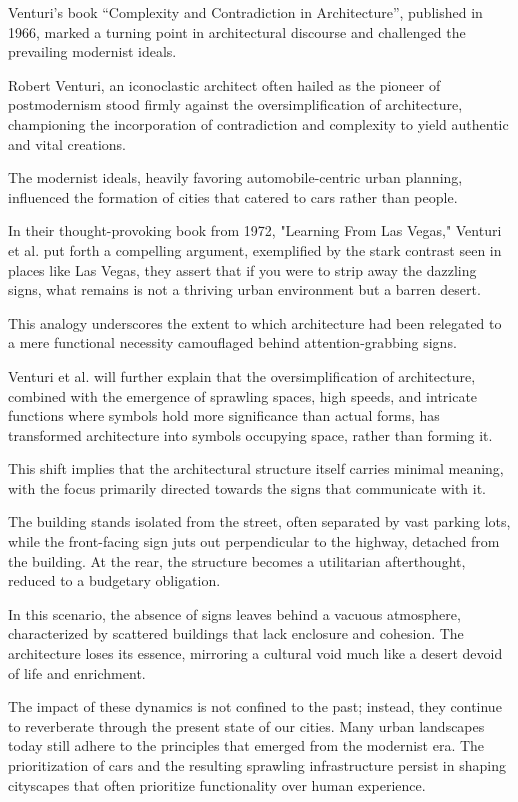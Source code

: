 Venturi's book ``Complexity and Contradiction in Architecture'', published in 1966, marked a turning point in architectural discourse and challenged the prevailing modernist ideals.

Robert Venturi, an iconoclastic architect often hailed as the pioneer of postmodernism\cite{Schudel2018} stood firmly against the oversimplification of architecture, championing the incorporation of contradiction and complexity to yield authentic and vital creations.

The modernist ideals, heavily favoring automobile-centric urban planning, influenced the formation of cities that catered to cars rather than people.

In their thought-provoking book from 1972, "Learning From Las Vegas," Venturi et al.\cite{Venturi1972} put forth a compelling argument, exemplified by the stark contrast seen in places like Las Vegas, they assert that if you were to strip away the dazzling signs, what remains is not a thriving urban environment but a barren desert.

This analogy underscores the extent to which architecture had been relegated to a mere functional necessity camouflaged behind attention-grabbing signs.

Venturi et al.\cite{Venturi1972} will further explain that the oversimplification of architecture, combined with the emergence of sprawling spaces, high speeds, and intricate functions where symbols hold more significance than actual forms, has transformed architecture into symbols occupying space, rather than forming it.

This shift implies that the architectural structure itself carries minimal meaning, with the focus primarily directed towards the signs that communicate with it.

The building stands isolated from the street, often separated by vast parking lots, while the front-facing sign juts out perpendicular to the highway, detached from the building.
At the rear, the structure becomes a utilitarian afterthought, reduced to a budgetary obligation\cite{Venturi1972}.

In this scenario, the absence of signs leaves behind a vacuous atmosphere, characterized by scattered buildings that lack enclosure and cohesion.
The architecture loses its essence, mirroring a cultural void much like a desert devoid of life and enrichment.

The impact of these dynamics is not confined to the past;
instead, they continue to reverberate through the present state of our cities.
Many urban landscapes today still adhere to the principles that emerged from the modernist era.
The prioritization of cars and the resulting sprawling infrastructure persist in shaping cityscapes that often prioritize functionality over human experience.


